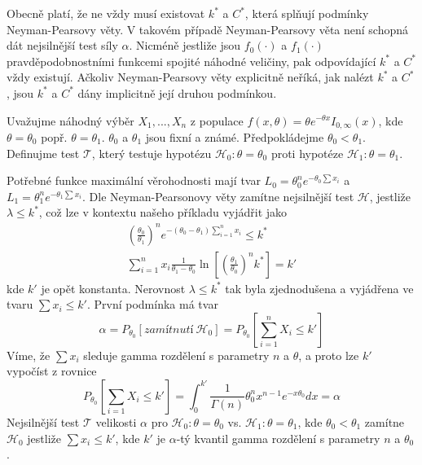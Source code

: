 Obecně platí, že ne vždy musí existovat $k^*$ a $C^*$, která splňují podmínky Neyman-Pearsovy věty. V takovém případě  Neyman-Pearsovy věta není schopná dát nejsilnější test síly $\alpha$. Nicméně jestliže jsou $f_0(\cdot)$ a $f_1(\cdot)$ pravděpodobnostními funkcemi spojité náhodné veličiny, pak odpovídající $k^*$ a $C^*$ vždy existují.
Ačkoliv Neyman-Pearsovy věty explicitně neříká, jak nalézt $k^*$ a $C^*$, jsou $k^*$ a $C^*$ dány implicitně její druhou podmínkou.

\begin{example}
Uvažujme náhodný výběr $X_1, ..., X_n$ z populace $f(x, \theta) = \theta e^{-\theta x}I_{0, \infty}(x)$, kde $\theta = \theta_0$ popř. $\theta = \theta_1$. $\theta_0$ a $\theta_1$ jsou fixní a známé. Předpokládejme $\theta_0 < \theta_1$. Definujme test $\mathscr{T}$, který testuje hypotézu $\mathscr{H}_0: \theta = \theta_0$ proti hypotéze $\mathscr{H}_1: \theta = \theta_1$.

Potřebné funkce maximální věrohodnosti mají tvar $L_0 = \theta_0^n e^{-\theta_0 \sum x_i}$ a $L_1 = \theta_1^n e^{-\theta_1 \sum x_i}$. Dle Neyman-Pearsonovy věty zamítne nejsilnější test $\mathscr{H}$, jestliže $\lambda \le k^*$, což lze v kontextu našeho příkladu vyjádřit jako
\begin{gather*}
\left(\frac{\theta_0}{\theta_1}\right)^n e^{-(\theta_0 - \theta_1)\sum_{i = 1}^n x_i} \le k^*\\
\sum_{i = 1}^n x_i \frac{1}{\theta_1 - \theta_0}\ln \left[\left(\frac{\theta_1}{\theta_0}\right)^n k^* \right] = k'
\end{gather*}
kde $k'$ je opět konstanta. Nerovnost $\lambda \le k^*$ tak byla zjednodušena a vyjádřena ve tvaru $\sum x_i \le k'$. První podmínka má tvar
\begin{equation*}
\alpha = P_{\theta_0}[\textit{zamítnutí} ~ \mathscr{H}_0] = P_{\theta_0}\left[\sum_{i = 1}^n X_i \le k' \right]
\end{equation*}
Víme, že $\sum x_i$ sleduje gamma rozdělení s parametry $n$ a $\theta$, a proto lze $k'$ vypočíst z rovnice
\begin{equation*}
P_{\theta_0}\left[\sum_{i = 1} X_i \le k' \right] = \int_0^{k'} \frac{1}{\Gamma(n)} \theta_0^n x^{n - 1}e^{-x \theta_0}dx = \alpha
\end{equation*}
Nejsilnější test $\mathscr{T}$ velikosti $\alpha$ pro $\mathscr{H}_0: \theta = \theta_0$ vs. $\mathscr{H}_1: \theta = \theta_1$, kde $\theta_0 < \theta_1$ zamítne $\mathscr{H}_0$ jestliže $\sum x_i \le k'$, kde $k'$ je $\alpha$-tý kvantil gamma rozdělení s parametry $n$ a $\theta_0$.
\end{example}

